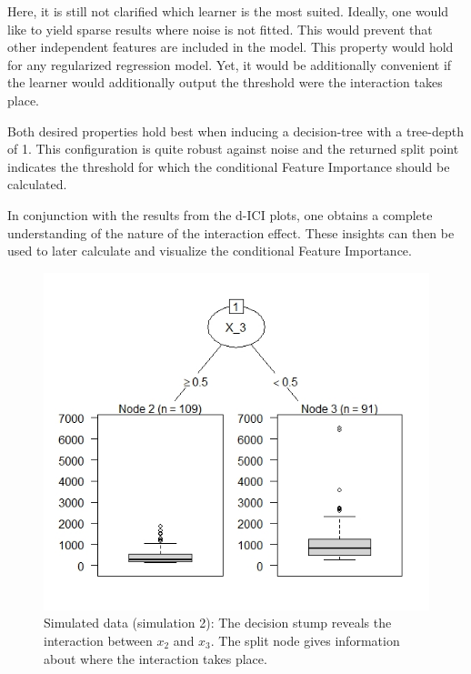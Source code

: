 \documentclass[
]{krantz}
\begin{document}
Here, it is still not clarified which learner is the most suited. Ideally, one would like to yield sparse results where noise is not fitted. This would prevent that other independent features are included in the model. This property would hold for any regularized regression model. Yet, it would be additionally convenient if the learner would additionally output the threshold were the interaction takes place.

Both desired properties hold best when inducing a decision-tree with a tree-depth of 1. This configuration is quite robust against noise and the returned split point indicates the threshold for which the conditional Feature Importance should be calculated.

In conjunction with the results from the d-ICI plots, one obtains a complete understanding of the nature of the interaction effect. These insights can then be used to later calculate and visualize the conditional Feature Importance.

\begin{figure}

{\centering \includegraphics[width=0.99\linewidth]{images/03-7-5} 

}

\caption{Simulated data (simulation 2): The decision stump reveals the interaction between $x_{2}$ and $x_{3}$. The split node gives information about where the interaction takes place.}\label{fig:fig5}
\end{figure}
\end{document}
